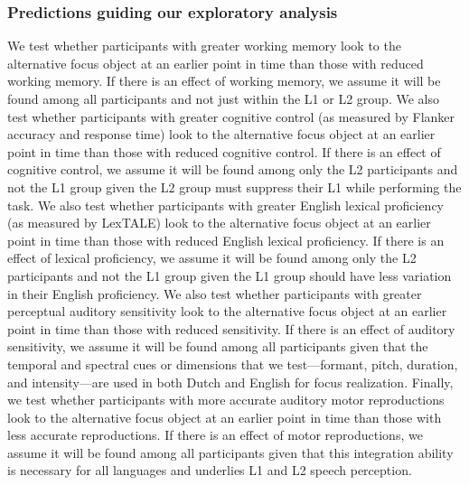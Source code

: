 \subsubsection{Predictions guiding our exploratory analysis} 
We test whether participants with greater working memory look to the alternative focus object at an earlier point in time than those with reduced working memory. If there is an effect of working memory, we assume it will be found among all participants and not just within the L1 or L2 group. We also test whether participants with greater cognitive control (as measured by Flanker accuracy and response time) look to the alternative focus object at an earlier point in time than those with reduced cognitive control. If there is an effect of cognitive control, we assume it will be found among only the L2 participants and not the L1 group given the L2 group must suppress their L1 while performing the task. We also test whether participants with greater English lexical proficiency (as measured by LexTALE) look to the alternative focus object at an earlier point in time than those with reduced English lexical proficiency. If there is an effect of lexical proficiency, we assume it will be found among only the L2 participants and not the L1 group given the L1 group should have less variation in their English proficiency. We also test whether participants with greater perceptual auditory sensitivity look to the alternative focus object at an earlier point in time than those with reduced sensitivity. If there is an effect of auditory sensitivity, we assume it will be found among all participants given that the temporal and spectral cues or dimensions that we test---formant,
pitch, duration, and intensity---are used in both Dutch and English for focus realization. Finally, we test whether participants with more accurate auditory motor reproductions look to the alternative focus object at an earlier point in time than those with less accurate reproductions. If there is an effect of motor reproductions, we assume it will be found among all participants given that this integration ability is necessary for all languages and underlies L1 and L2 speech perception.
